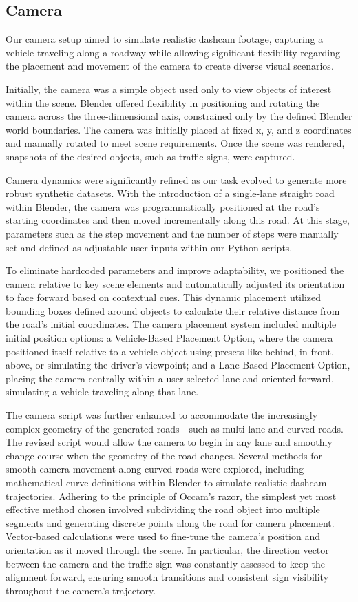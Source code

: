 \documentclass[journal]{IEEEtran}
\begin{document}
\subsection{Camera}
Our camera setup aimed to simulate realistic dashcam footage, capturing a vehicle traveling along a roadway while allowing significant flexibility regarding the placement and movement of the camera to create diverse visual scenarios. 

Initially, the camera was a simple object used only to view objects of interest within the scene. Blender offered flexibility in positioning and rotating the camera across the three-dimensional axis, constrained only by the defined Blender world boundaries. The camera was initially placed at fixed x, y, and z coordinates and manually rotated to meet scene requirements. Once the scene was rendered, snapshots of the desired objects, such as traffic signs, were captured.

Camera dynamics were significantly refined as our task evolved to generate more robust synthetic datasets. With the introduction of a single-lane straight road within Blender, the camera was programmatically positioned at the road's starting coordinates and then moved incrementally along this road. At this stage, parameters such as the step movement and the number of steps were manually set and defined as adjustable user inputs within our Python scripts.

To eliminate hardcoded parameters and improve adaptability, we positioned the camera relative to key scene elements and automatically adjusted its orientation to face forward based on contextual cues. This dynamic placement utilized bounding boxes defined around objects to calculate their relative distance from the road's initial coordinates. The camera placement system included multiple initial position options: a Vehicle-Based Placement Option, where the camera positioned itself relative to a vehicle object using presets like behind, in front, above, or simulating the driver's viewpoint; and a Lane-Based Placement Option, placing the camera centrally within a user-selected lane and oriented forward, simulating a vehicle traveling along that lane.

The camera script was further enhanced to accommodate the increasingly complex geometry of the generated roads—such as multi-lane and curved roads. The revised script would allow the camera to begin in any lane and smoothly change course when the geometry of the road changes. Several methods for smooth camera movement along curved roads were explored, including mathematical curve definitions within Blender to simulate realistic dashcam trajectories. Adhering to the principle of Occam's razor, the simplest yet most effective method chosen involved subdividing the road object into multiple segments and generating discrete points along the road for camera placement. Vector-based calculations were used to fine-tune the camera's position and orientation as it moved through the scene. In particular, the direction vector between the camera and the traffic sign was constantly assessed to keep the alignment forward, ensuring smooth transitions and consistent sign visibility throughout the camera's trajectory.
\end{document}
